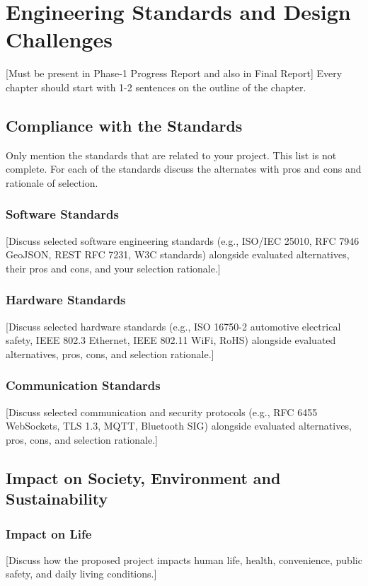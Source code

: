 \chapter{Engineering Standards and Design Challenges}

[Must be present in Phase-1 Progress Report and also in Final Report] Every chapter should start with 1-2 sentences on the outline of the chapter.

\section{Compliance with the Standards}
Only mention the standards that are related to your project. This list is not complete. For each of the standards discuss the alternates with pros and cons and rationale of selection.

\subsection{Software Standards}
[Discuss selected software engineering standards (e.g., ISO/IEC 25010, RFC 7946 GeoJSON, REST RFC 7231, W3C standards) alongside evaluated alternatives, their pros and cons, and your selection rationale.]

\subsection{Hardware Standards}
[Discuss selected hardware standards (e.g., ISO 16750-2 automotive electrical safety, IEEE 802.3 Ethernet, IEEE 802.11 WiFi, RoHS) alongside evaluated alternatives, pros, cons, and selection rationale.]

\subsection{Communication Standards}
[Discuss selected communication and security protocols (e.g., RFC 6455 WebSockets, TLS 1.3, MQTT, Bluetooth SIG) alongside evaluated alternatives, pros, cons, and selection rationale.]

\section{Impact on Society, Environment and Sustainability}

\subsection{Impact on Life}
[Discuss how the proposed project impacts human life, health, convenience, public safety, and daily living conditions.]

